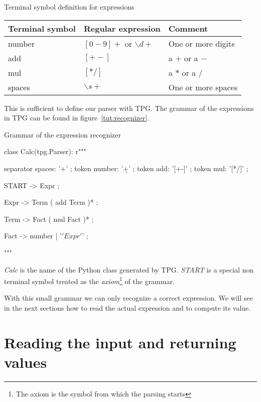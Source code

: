 \begin{tableau}
\caption{Terminal symbol definition for expressions}        \label{tut:token_calc}
\begin{tabular}{| l | l | l |}
\hline
    Terminal symbol & Regular expression & Comment \\
\hline
\hline
    number & $[0-9]+$ or $\backslash d+$ & One or more digits \\
\hline
    add & $[+-]$ & a $+$ or a $-$ \\
\hline
    mul & $[*/]$ & a $*$ or a $/$ \\
\hline
    spaces & $\backslash s+$ & One or more spaces \\
\hline
\end{tabular}
\end{tableau}

This is sufficient to define our parser with TPG. The grammar of the expressions in TPG can be found in figure~\ref{tut:recognizer}.

\begin{code}
\caption{Grammar of the expression recognizer}              \label{tut:recognizer}
\begin{verbatimtab}[4]
class Calc(tpg.Parser):
    r"""

    separator spaces: '\s+' ;
    token number: '\d+' ;
    token add: '[+-]' ;
    token mul: '[*/]' ;

    START -> Expr ;

    Expr -> Term ( add Term )* ;

    Term -> Fact ( mul Fact )* ;

    Fact -> number | '\(' Expr '\)' ;

    """
\end{verbatimtab}
\end{code}

\emph{Calc} is the name of the Python class generated by TPG. \emph{START} is a special non terminal symbol treated as the \emph{axiom}\footnote{The axiom is the symbol from which the parsing starts} of the grammar.

With this small grammar we can only recognize a correct expression. We will see in the next sections how to read the actual expression and to compute its value.

\section{Reading the input and returning values}

